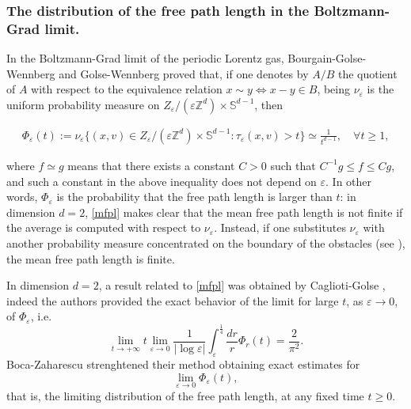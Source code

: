 \documentclass[a4paper,10pt,reqno]{amsart}
\numberwithin{equation}{subsection}
\numberwithin{figure}{subsection}
\begin{document}
\subsubsection{The distribution of the free path length in the Boltzmann-Grad limit.} In the Boltzmann-Grad limit of the periodic Lorentz gas, Bourgain-Golse-Wennberg \cite{BGW1998} and Golse-Wennberg \cite{GW2000} proved that, if one denotes by $A/B$ the quotient of $A$ with respect to the equivalence relation $x\sim y\Leftrightarrow x-y\in B$, being $\nu_{\varepsilon}$ is the uniform probability measure on $Z_{\varepsilon}/(\varepsilon\mathbb{Z}^d)\times\mathbb{S}^{d-1}$, then

\begin{align}\label{mfpl}
\Phi_{\varepsilon}(t):=\nu_{\varepsilon}\{(x,v)\in Z_{\varepsilon}/(\varepsilon\mathbb{Z}^d)\times\mathbb{S}^{d-1}:\tau_{\varepsilon}(x,v)>t\}\simeq\frac{1}{t^{d-1}},\quad\forall t\geq1,
\end{align}

where $f\simeq g$ means that there exists a constant $C>0$ such that $C^{-1}g\leq  f\leq Cg$, and such a constant in the above inequality does not depend on $\varepsilon$. In other words, $\Phi_{\varepsilon}$ is the probability that the free path length is larger than $t$: in dimension $d=2$, \eqref{mfpl} makes clear that the mean free path length is not finite if the average is computed with respect to $\nu_{\varepsilon}$. Instead, if one substitutes $\nu_{\varepsilon}$ with another probability measure concentrated on the boundary of the obstacles (see \cite{DDG1996}), the mean free path length is finite.

In dimension $d=2$, a result related to \eqref{mfpl} was obtained by Caglioti-Golse \cite{CG2003}, indeed the authors provided the exact behavior of the limit for large $t$, as $\varepsilon\to0$, of $\Phi_{\varepsilon}$, i.e.
\[
\lim_{t\to+\infty}t\lim_{\varepsilon\to0}\frac{1}{|\log\varepsilon|}\int_{\varepsilon}^{\frac{1}{4}}\frac{dr}{r}\Phi_r(t)=\frac{2}{\pi^2}.
\]
Boca-Zaharescu \cite{BZ2007} strenghtened their method obtaining exact estimates for
\[
\lim_{\varepsilon\to0}\Phi_{\varepsilon}(t),
\]
that is, the limiting distribution of the free path length, at any fixed time $t\geq0$.
\end{document}
